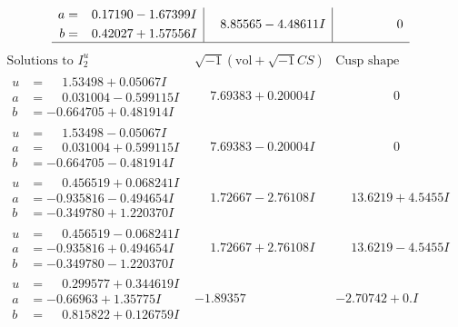 \documentclass[1p]{elsarticle_modified}
\theoremstyle{definition}
\newcommand{\I}{\sqrt{-1}}
\begin{document}
$$\begin{array}{c|c|c}
\begin{aligned}
a &= \phantom{-}0.17190 - 1.67399 I \\
b &= \phantom{-}0.42027 + 1.57556 I\end{aligned}
 & \phantom{-}8.85565 - 4.48611 I & \phantom{-0.000000 } 0\\
 \hline 
 \end{array}$$\newpage$$\begin{array}{c|c|c}  
\text{Solutions to }I^u_{2}& \I (\text{vol} + \sqrt{-1}CS) & \text{Cusp shape}\\
 \hline 
\begin{aligned}
u &= \phantom{-}1.53498 + 0.05067 I \\
a &= \phantom{-}0.031004 - 0.599115 I \\
b &= -0.664705 + 0.481914 I\end{aligned}
 & \phantom{-}7.69383 + 0.20004 I & \phantom{-0.000000 } 0 \\ \hline\begin{aligned}
u &= \phantom{-}1.53498 - 0.05067 I \\
a &= \phantom{-}0.031004 + 0.599115 I \\
b &= -0.664705 - 0.481914 I\end{aligned}
 & \phantom{-}7.69383 - 0.20004 I & \phantom{-0.000000 } 0 \\ \hline\begin{aligned}
u &= \phantom{-}0.456519 + 0.068241 I \\
a &= -0.935816 - 0.494654 I \\
b &= -0.349780 + 1.220370 I\end{aligned}
 & \phantom{-}1.72667 - 2.76108 I & \phantom{-}13.6219 + 4.5455 I \\ \hline\begin{aligned}
u &= \phantom{-}0.456519 - 0.068241 I \\
a &= -0.935816 + 0.494654 I \\
b &= -0.349780 - 1.220370 I\end{aligned}
 & \phantom{-}1.72667 + 2.76108 I & \phantom{-}13.6219 - 4.5455 I \\ \hline\begin{aligned}
u &= \phantom{-}0.299577 + 0.344619 I \\
a &= -0.66963 + 1.35775 I \\
b &= \phantom{-}0.815822 + 0.126759 I\end{aligned}
 & -1.89357\phantom{ +0.000000I} & -2.70742 + 0. I\phantom{ +0.000000I} \\ \hline\begin{aligned}

\end{aligned}
\end{array}$$
\end{document}
